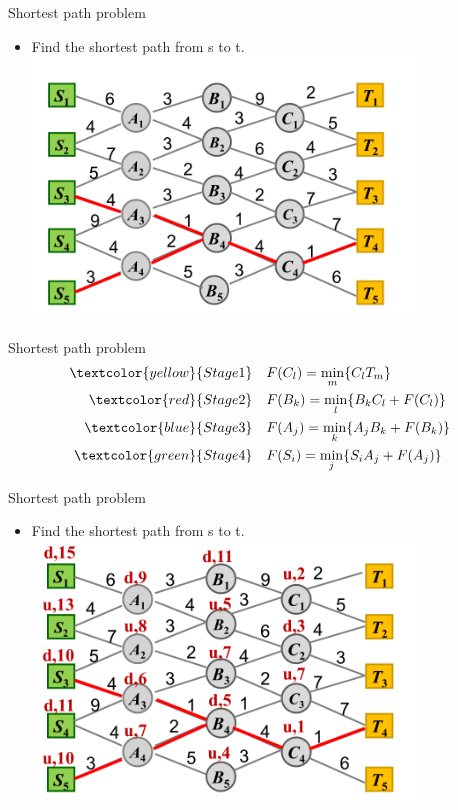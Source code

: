     \begin{frame}{Shortest path problem}
      \begin{itemize}
        \item Find the shortest path from s to t.
        \centering
        \includegraphics[width = 0.8\textwidth]{images/Shortest3.png}
      \end{itemize}
    \end{frame}

    \begin{frame}{Shortest path problem}
    \begin{equation*}
      \begin{align}
    \textcolor{yellow}{Stage 1}\quad &F(C_l) = \min_m\{C_lT_m\} \\
    \vspace{4pt}
    \textcolor{red}{Stage 2}\quad &F(B_k) = \min_l\{B_kC_l+F(C_l)\} \\
    \vspace{4pt}
    \textcolor{blue}{Stage 3}\quad &F(A_j) = \min_k\{A_jB_k+F(B_k)\} \\
    \vspace{4pt}
    \textcolor{green}{Stage 4}\quad &F(S_i) = \min_j\{S_iA_j+F(A_j)\}
    \end{align}
    \end{equation*}
    \end{frame}

    \begin{frame}{Shortest path problem}
      \begin{itemize}
        \item Find the shortest path from s to t.
        \centering
        \includegraphics[width = 0.8\textwidth]{images/Shortest2.png}
      \end{itemize}
    \end{frame}
